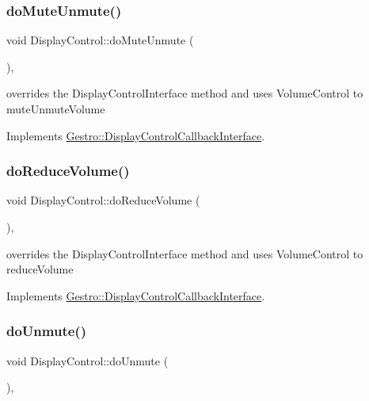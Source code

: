 \subsubsection{\texorpdfstring{do\+Mute\+Unmute()}{doMuteUnmute()}}
{\footnotesize\ttfamily void Display\+Control\+::do\+Mute\+Unmute (\begin{DoxyParamCaption}{ }\end{DoxyParamCaption})\hspace{0.3cm}{\ttfamily [override]}, {\ttfamily [virtual]}}

overrides the Display\+Control\+Interface method and uses Volume\+Control to mute\+Unmute\+Volume 

Implements \hyperlink{classGestro_1_1DisplayControlCallbackInterface_ab660632d549760b0404388fc8e86714a}{Gestro\+::\+Display\+Control\+Callback\+Interface}.

\mbox{\label{classGestro_1_1DisplayControl_a874fa3f6b3e4cf465db62a4eba1c1dd1}} 
\subsubsection{\texorpdfstring{do\+Reduce\+Volume()}{doReduceVolume()}}
{\footnotesize\ttfamily void Display\+Control\+::do\+Reduce\+Volume (\begin{DoxyParamCaption}{ }\end{DoxyParamCaption})\hspace{0.3cm}{\ttfamily [override]}, {\ttfamily [virtual]}}

overrides the Display\+Control\+Interface method and uses Volume\+Control to reduce\+Volume 

Implements \hyperlink{classGestro_1_1DisplayControlCallbackInterface_a8648fb64585379393917e6b50e348070}{Gestro\+::\+Display\+Control\+Callback\+Interface}.

\mbox{\label{classGestro_1_1DisplayControl_a210411b559d8c3ffb1498f49cfa26a6d}} 
\subsubsection{\texorpdfstring{do\+Unmute()}{doUnmute()}}
{\footnotesize\ttfamily void Display\+Control\+::do\+Unmute (\begin{DoxyParamCaption}{ }\end{DoxyParamCaption})\hspace{0.3cm}{\ttfamily [override]}, {\ttfamily [virtual]}}

